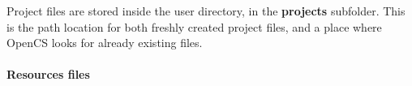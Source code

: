 Project files are stored inside the user directory, in the \textbf{projects} subfolder. This is the path location for both freshly created project files, and a place where Open{CS} looks for already existing files.\\

\paragraph{Resources files}

